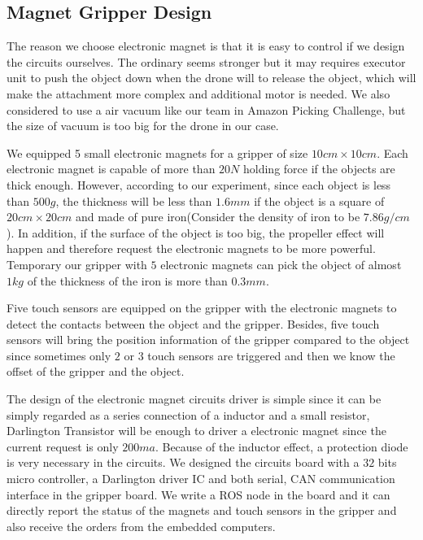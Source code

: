 \documentclass{standalone}
\begin{document}
\subsection{Magnet Gripper Design}
The reason we choose electronic magnet is that it is easy to control if we design the circuits ourselves. The ordinary seems stronger but it may requires executor unit to push the object down when the drone will to release the object, which will make the attachment more complex and additional motor is needed. We also considered to use a air vacuum like our team in Amazon Picking Challenge, but the size of vacuum is too big for the drone in our case. 

We equipped 5 small electronic magnets for a gripper of size $10cm \times 10cm$. Each electronic magnet is capable of more than $20N$ holding force if the objects are thick enough. However, according to our experiment, since each object is less than $500g$, the thickness will be less than $1.6mm$ if the object is a square of $20cm \times 20cm$ and made of pure iron(Consider the density of iron to be $7.86g/cm$). In addition, if the surface of the object is too big, the propeller effect will happen and therefore request the electronic magnets to be more powerful. Temporary our gripper with $5$ electronic magnets can pick the object of almost $1kg$ of the thickness of the iron is more than $0.3mm$. 

Five touch sensors are equipped on the gripper with the electronic magnets to detect the contacts between the object and the gripper. Besides, five touch sensors will bring the position information of the gripper compared to the object since sometimes only $2$ or $3$ touch sensors are triggered and then we know the offset of the gripper and the object. 

The design of the electronic magnet circuits driver is simple since it can be simply regarded as a series connection of a inductor and a small resistor, Darlington Transistor will be enough to driver a electronic magnet since the current request is only $200ma$. Because of the inductor effect, a protection diode is very necessary in the circuits. We designed the circuits board with a $32$ bits micro controller, a Darlington driver IC and both serial, CAN communication interface in the gripper board. We write a ROS node in the board and it can directly report the status of the magnets and touch sensors in the gripper and also receive the orders from the embedded computers. 
\end{document}
